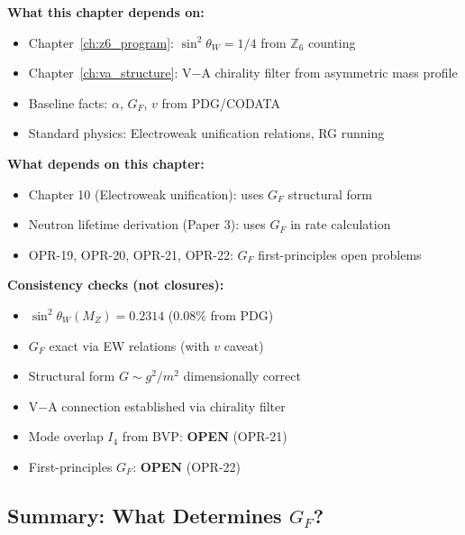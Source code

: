\begin{tcolorbox}[colback=gray!5!white, colframe=gray!60!black,
    title=\textbf{Dependency Map \& Status}]
\textbf{What this chapter depends on:}
\begin{itemize}[nosep]
    \item Chapter~\ref{ch:z6_program}: $\sin^2\theta_W = 1/4$ from $\mathbb{Z}_6$ counting \tagDer{}
    \item Chapter~\ref{ch:va_structure}: V$-$A chirality filter from asymmetric mass profile \tagDc{}
    \item Baseline facts: $\alpha$, $G_F$, $v$ from PDG/CODATA \tagBL{}
    \item Standard physics: Electroweak unification relations, RG running \tagBL{}
\end{itemize}

\textbf{What depends on this chapter:}
\begin{itemize}[nosep]
    \item Chapter 10 (Electroweak unification): uses $G_F$ structural form
    \item Neutron lifetime derivation (Paper 3): uses $G_F$ in rate calculation
    \item OPR-19, OPR-20, OPR-21, OPR-22: $G_F$ first-principles open problems
\end{itemize}

\textbf{Consistency checks (not closures):}
\begin{itemize}[nosep]
    \item[\ding{51}] $\sin^2\theta_W(M_Z) = 0.2314$ (0.08\% from PDG) \tagDer{}
    \item[\ding{51}] $G_F$ exact via EW relations (with $v$ caveat) \tagDc{}
    \item[\ding{51}] Structural form $G \sim g^2/m^2$ dimensionally correct \tagDc{}
    \item[\ding{51}] V$-$A connection established via chirality filter \tagDc{}
    \item[$\circ$] Mode overlap $I_4$ from BVP: \textbf{OPEN} (OPR-21)
    \item[$\circ$] First-principles $G_F$: \textbf{OPEN} (OPR-22)
\end{itemize}
\end{tcolorbox}

\subsection{\texorpdfstring{Summary: What Determines $G_F$?}{Summary: What Determines GF?}}
\label{sec:ch11_summary_table}

